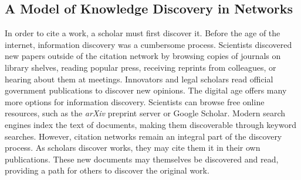 \documentclass[10pt]{bmc_article}
\newenvironment{bmcformat}{\baselineskip20pt\sloppy\setboolean{publ}{false}}{\baselineskip20pt\sloppy}
\begin{document}
\begin{bmcformat}
\subsection{A Model of Knowledge Discovery in Networks}
\label{sec:models}
In order to cite a work, a scholar must first discover it.
Before the age of the internet, information discovery was a cumbersome process. Scientists discovered new papers outside of the citation network by browsing copies of journals on library shelves, reading popular press, receiving reprints from colleagues, or hearing about them at meetings. Innovators and legal scholars read official government publications to discover new opinions.
The digital age offers many more options for information discovery. Scientists can browse free online resources, such as the \emph{arXiv} preprint server or Google Scholar. Modern search engines index the text of documents, making them discoverable through keyword searches. However, citation networks remain an integral part of the discovery process. As scholars discover works, they may cite them it in their own publications. These new documents may themselves be discovered and read, providing a path for others to discover the original work. %





\end{bmcformat}
\end{document}
